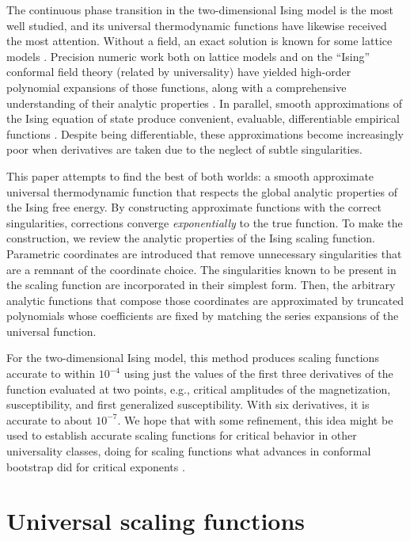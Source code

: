 \documentclass[
aps,
pre,
preprint,
longbibliography,
floatfix
]{revtex4-2}
\begin{document}
The continuous phase transition in the two-dimensional Ising model is the most
well studied, and its universal thermodynamic functions have likewise received
the most attention. Without a field, an exact solution is known for some
lattice models \cite{Onsager_1944_Crystal}. Precision numeric work both on
lattice models and on the ``Ising'' conformal field theory (related by
universality) have yielded high-order polynomial expansions of those functions,
along with a comprehensive understanding of their analytic properties
\cite{Fonseca_2003_Ising, Mangazeev_2008_Variational, Mangazeev_2010_Scaling}.
In parallel, smooth approximations of the Ising equation of state produce
convenient, evaluable, differentiable empirical functions
\cite{Caselle_2001_The}. Despite being differentiable, these approximations
become increasingly poor when derivatives are taken due to the neglect of
subtle singularities.

This paper attempts to find the best of both worlds: a smooth approximate
universal thermodynamic function that respects the global analytic properties
of the Ising free energy. By constructing approximate functions with the
correct singularities, corrections converge \emph{exponentially} to the true
function.  To make the construction, we review the analytic properties of the
Ising scaling function. Parametric coordinates are introduced that remove
unnecessary singularities that are a remnant of the coordinate choice. The
singularities known to be present in the scaling function are incorporated in
their simplest form. Then, the arbitrary analytic functions that compose those
coordinates are approximated by truncated polynomials whose coefficients are
fixed by matching the series expansions of the universal function.

For the two-dimensional Ising model, this method produces scaling functions
accurate to within $10^{-4}$ using just the values of the first three
derivatives of the function evaluated at two points, e.g., critical amplitudes
of the magnetization, susceptibility, and first generalized susceptibility.
With six derivatives, it is accurate to about $10^{-7}$. We hope that with some
refinement, this idea might be used to establish accurate scaling functions for
critical behavior in other universality classes, doing for scaling functions
what advances in conformal bootstrap did for critical exponents
\cite{Gliozzi_2014_Critical}.

\section{Universal scaling functions}
\end{document}

